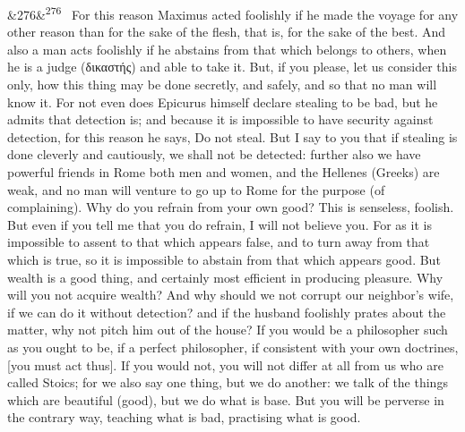 \documentclass[12pt]{article}
\newcommand{\para}[1][]{\par\noindent\ifx&#1&\else\textsuperscript{\footnotesize #1}~\fi}
\begin{document}
\para[276] For this reason Maximus acted foolishly if he made the voyage for any other reason than for the sake of the flesh, that is, for the sake of the best. And also a man acts foolishly if he abstains from that which belongs to others, when he is a judge (δικαστής) and able to take it. But, if you please, let us consider this only, how this thing may be done secretly, and safely, and so that no man will know it. For not even does Epicurus himself declare stealing to be bad, but he admits that detection is; and because it is impossible to have security against detection, for this reason he says, Do not steal. But I say to you that if stealing is done cleverly and cautiously, we shall not be detected: further also we have powerful friends in Rome both men and women, and the Hellenes (Greeks) are weak, and no man will venture to go up to Rome for the purpose (of complaining). Why do you refrain from your own good? This is senseless, foolish. But even if you tell me that you do refrain, I will not believe you. For as it is impossible to assent to that which appears false, and to turn away from that which is true, so it is impossible to abstain from that which appears good. But wealth is a good thing, and certainly most efficient in producing pleasure. Why will you not acquire wealth? And why should we not corrupt our neighbor's wife, if we can do it without detection? and if the husband foolishly prates about the matter, why not pitch him out of the house? If you would be a philosopher such as you ought to be, if a perfect philosopher, if consistent with your own doctrines, [you must act thus]. If you would not, you will not differ at all from us who are called Stoics; for we also say one thing, but we do another: we talk of the things which are beautiful (good), but we do what is base. But you will be perverse in the contrary way, teaching what is bad, practising what is good.
\end{document}

